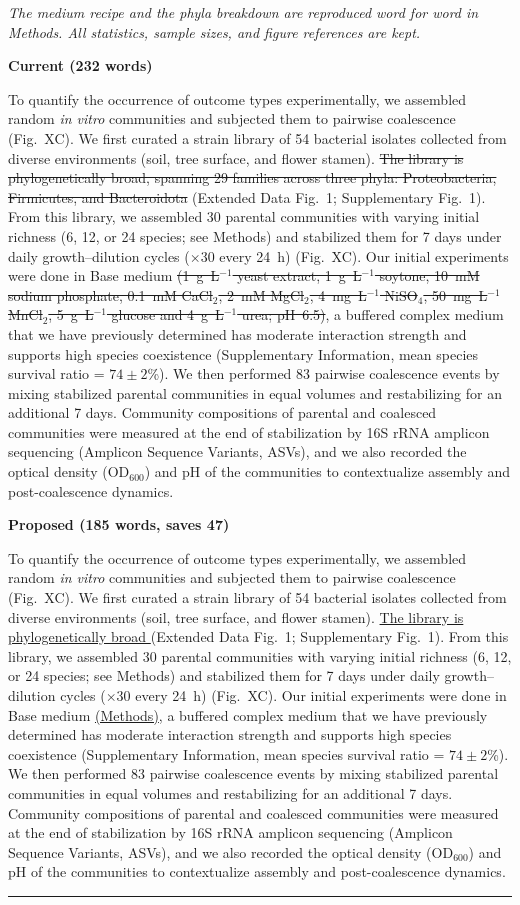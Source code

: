 \documentclass[11pt,a4paper]{article}
\newcommand{\figref}[1]{Fig.~X}
\newcommand{\cutx}[1]{{\color{CutRed}\sout{#1}}}
\newcommand{\newx}[1]{{\color{CutRed}\uline{#1}}}
\newcommand{\rationale}[1]{{\color{GrayNote}\small\textit{#1}}\par\smallskip}
\newcommand{\panel}[1]{\par\smallskip\noindent\textbf{\small #1}\par}
\newcommand{\decision}{\par\smallskip\noindent{\color{GrayNote}\small$\square$~accept\quad$\square$~reject\quad$\square$~modify}\par
\noindent\rule{\linewidth}{0.4pt}}
\begin{document}
\rationale{The medium recipe and the phyla breakdown are reproduced word for word in Methods. All statistics, sample sizes, and figure references are kept.}
\panel{Current (232 words)}
To quantify the occurrence of outcome types experimentally, we assembled random \textit{in vitro} communities and subjected them to pairwise coalescence (\figref{fig:fig1}C). We first curated a strain library of 54 bacterial isolates collected from diverse environments (soil, tree surface, and flower stamen). \cutx{The library is phylogenetically broad, spanning 29 families across three phyla: Proteobacteria, Firmicutes, and Bacteroidota }(Extended Data Fig.~1; Supplementary Fig.~1). From this library, we assembled 30 parental communities with varying initial richness (6, 12, or 24 species; see Methods) and stabilized them for 7 days under daily growth--dilution cycles ($\times$30 every 24~h) (\figref{fig:fig1}C). Our initial experiments were done in Base medium \cutx{(1~g~L$^{-1}$ yeast extract, 1~g~L$^{-1}$ soytone, 10~mM sodium phosphate, 0.1~mM CaCl$_2$, 2~mM MgCl$_2$, 4~mg~L$^{-1}$ NiSO$_4$, 50~mg~L$^{-1}$ MnCl$_2$, 5~g~L$^{-1}$ glucose and 4~g~L$^{-1}$ urea; pH~6.5)}, a buffered complex medium that we have previously determined has moderate interaction strength and supports high species coexistence (Supplementary Information, mean species survival ratio = $74 \pm 2$\%). We then performed 83 pairwise coalescence events by mixing stabilized parental communities in equal volumes and restabilizing for an additional 7 days. Community compositions of parental and coalesced communities were measured at the end of stabilization by 16S rRNA amplicon sequencing (Amplicon Sequence Variants, ASVs), and we also recorded the optical density (OD$_{600}$) and pH of the communities to contextualize assembly and post-coalescence dynamics.
\panel{Proposed (185 words, saves 47)}
To quantify the occurrence of outcome types experimentally, we assembled random \textit{in vitro} communities and subjected them to pairwise coalescence (\figref{fig:fig1}C). We first curated a strain library of 54 bacterial isolates collected from diverse environments (soil, tree surface, and flower stamen). \newx{The library is phylogenetically broad }(Extended Data Fig.~1; Supplementary Fig.~1). From this library, we assembled 30 parental communities with varying initial richness (6, 12, or 24 species; see Methods) and stabilized them for 7 days under daily growth--dilution cycles ($\times$30 every 24~h) (\figref{fig:fig1}C). Our initial experiments were done in Base medium \newx{(Methods)}, a buffered complex medium that we have previously determined has moderate interaction strength and supports high species coexistence (Supplementary Information, mean species survival ratio = $74 \pm 2$\%). We then performed 83 pairwise coalescence events by mixing stabilized parental communities in equal volumes and restabilizing for an additional 7 days. Community compositions of parental and coalesced communities were measured at the end of stabilization by 16S rRNA amplicon sequencing (Amplicon Sequence Variants, ASVs), and we also recorded the optical density (OD$_{600}$) and pH of the communities to contextualize assembly and post-coalescence dynamics.
\decision
\end{document}
